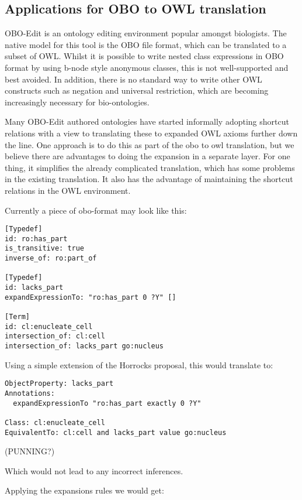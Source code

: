 \documentclass[11pt]{article}
\begin{document}
\subsection{Applications for OBO to OWL translation}

OBO-Edit is an ontology editing environment popular amongst
biologists\cite{Day-Richter2007}. The native model for this tool is
the OBO file format, which can be translated to a subset of
OWL\cite{Horrocks}\cite{tirmizi2009}. Whilst it is possible to write
nested class expressions in OBO format by using b-node style anonymous
classes, this is not well-supported and best avoided. In addition,
there is no standard way to write other OWL constructs such as
negation and universal restriction, which are becoming increasingly
necessary for bio-ontologies.

Many OBO-Edit authored ontologies have started informally adopting
shortcut relations with a view to translating these to expanded OWL
axioms further down the line. One approach is to do this as part of
the obo to owl translation, but we believe there are advantages to
doing the expansion in a separate layer. For one thing, it simplifies
the already complicated translation, which has some problems in the
existing translation. It also has the advantage of maintaining the
shortcut relations in the OWL environment.

Currently a piece of obo-format may look like this:

\begin{verbatim}
[Typedef]
id: ro:has_part
is_transitive: true
inverse_of: ro:part_of

[Typedef]
id: lacks_part
expandExpressionTo: "ro:has_part 0 ?Y" []

[Term]
id: cl:enucleate_cell
intersection_of: cl:cell
intersection_of: lacks_part go:nucleus
\end{verbatim}

Using a simple extension of the Horrocks proposal, this would translate to:

\begin{verbatim}
ObjectProperty: lacks_part
Annotations:
  expandExpressionTo "ro:has_part exactly 0 ?Y"

Class: cl:enucleate_cell
EquivalentTo: cl:cell and lacks_part value go:nucleus
\end{verbatim}

(PUNNING?)

Which would not lead to any incorrect inferences.

Applying the expansions rules we would get:
\end{document}
